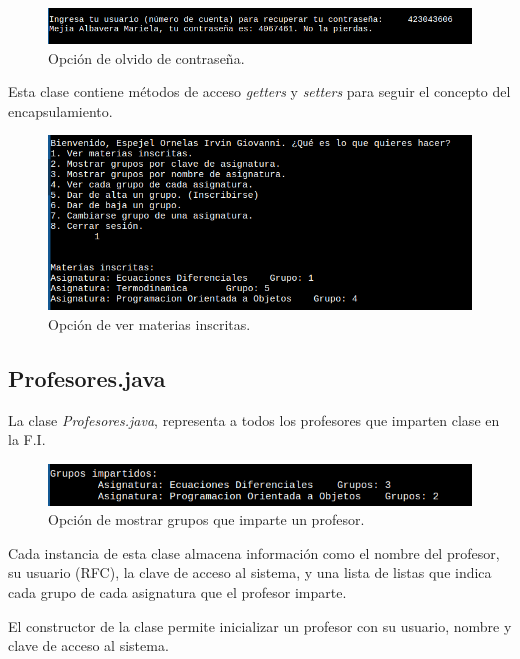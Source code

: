\documentclass[a4paper,12pt]{article}
\begin{document}
\begin{figure}[ht]
    \centering
    \includegraphics[width=.9\textwidth]{media/olvido_de_contrasena.png}
    \caption{Opción de olvido de contraseña.}
    \label{fig:olvido}
\end{figure}

Esta clase contiene métodos de acceso \textit{getters} y \textit{setters} para seguir el concepto del encapsulamiento.

\begin{figure}[ht]
    \centering
    \includegraphics[width=.9\textwidth]{media/ver_materias_inscritas.png}
    \caption{Opción de ver materias inscritas.}
    \label{fig:matins}
\end{figure}

\subsection{Profesores.java}

La clase \textit{Profesores.java}, representa a todos los profesores que imparten clase en la F.I.

\begin{figure}[ht]
    \centering
    \includegraphics[width=.9\textwidth]{media/grupos_impartidos.png}
    \caption{Opción de mostrar grupos que imparte un profesor.}
    \label{fig:grupos_impartidos}
\end{figure}

Cada instancia de esta clase almacena información como el nombre del profesor, su usuario (RFC), la clave de acceso al sistema, y una lista de listas que indica cada grupo de cada asignatura que el profesor imparte.

El constructor de la clase permite inicializar un profesor con su usuario, nombre y clave de acceso al sistema.
\end{document}
